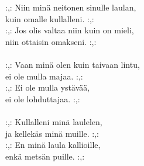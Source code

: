 
        :,: Niin minä neitonen sinulle laulan, \\
        kuin omalle kullalleni. :,: \\
        :,: Jos olis valtaa niin kuin on mieli, \\
        niin ottaisin omakseni. :,: \\
\hspace{10mm} \\
        :,: Vaan minä olen kuin taivaan lintu, \\
        ei ole mulla majaa. :,: \\
        :,: Ei ole mulla ystävää, \\
        ei ole lohduttajaa. :,: \\
\hspace{10mm} \\
        :,: Kullalleni minä laulelen, \\
        ja kellekäs minä muille. :,: \\
        :,: En minä laula kallioille, \\
        enkä metsän puille. :,: \\
